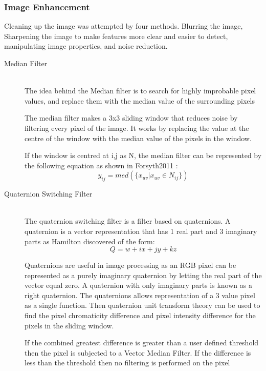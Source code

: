 \subsubsection{Image Enhancement}
Cleaning up the image was attempted by four methods. Blurring the image, Sharpening the image to make features more clear and easier to detect, manipulating image properties, and noise reduction. 
\begin{description}
\item[Median Filter]\hfill \\The idea behind the Median filter is to search for highly improbable pixel values, and replace them with the median value of the surrounding pixels \cite{davies2012computer}

The median filter makes a 3x3 sliding window that reduces noise by filtering every pixel of the image. It works by replacing the value at the centre of the window with the median value of the pixels in the window.

If the window is centred at i,j as N, the median filter can be represented by the following equation as shown in Forsyth2011 \cite{forsyth2011computer}:
\begin{equation}
y_{ij}=med(\lbrace x_{uv}|x_{uv}\in N_{ij} \rbrace)
\end{equation}

\item[Quaternion Switching Filter]\hfill \\
The quaternion switching filter \cite{web:QNSF} is a filter based on quaternions.
A quaternion is a vector representation that has 1 real part and 3 imaginary parts as Hamilton discovered \cite{article:Hamilton1844} of the form:
\begin{equation}
Q=w+ix+jy+kz
\end{equation} 

Quaternions are useful in image processing as an RGB pixel can be represented as a purely imaginary quaternion by letting the real part of the vector equal zero. A quaternion with only imaginary parts is known as a right quaternion.\cite{article:Hamilton1866}
The quaternions allows representation of a 3 value pixel as a single function. Then quaternion unit transform theory can be used to find the pixel chromaticity difference and pixel intensity difference for the pixels in the sliding window.

If the combined greatest difference is greater than a user defined threshold then the pixel is subjected to a Vector Median Filter. If the difference is less than the threshold then no filtering is performed on the pixel
\end{description}
 
